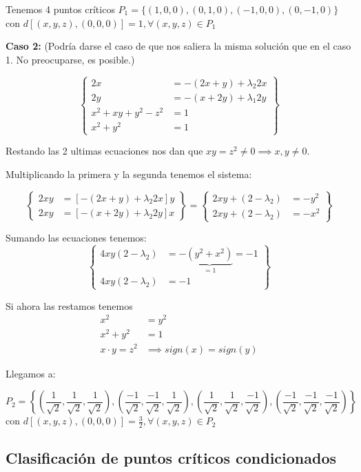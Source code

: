 Tenemos 4 puntos críticos $P_1 = \{(1,0,0),(0,1,0),(-1,0,0),(0,-1,0)\}$ con $d[(x,y,z),(0,0,0)]=1, \forall (x,y,z)\in P_1$

\textbf{Caso 2:} (Podría darse el caso de que nos saliera la misma solución que en el caso 1. No preocuparse, es posible.)


\[\left\{\begin{array}{cc}
2x&= -(2x+y) + \lambda_2 2x\\
2y&= -(x+2y) + \lambda_1 2y\\
x^2+xy+y^2 -z^2 &= 1\\
x^2+y^2&=1
\end{array}\right\}\]

Restando las 2 ultimas ecuaciones nos dan que $xy = z^2 \neq 0 \implies x,y\neq 0$.

Multiplicando la primera y la segunda tenemos el sistema:

\[\left\{\begin{array}{cc}
2xy &= \left[-(2x+y)+\lambda_2 2x\right]y\\
2xy &= \left[-(x+2y)+\lambda_2 2y\right]x
\end{array}\right\} = \left\{\begin{array}{cc}
2xy+(2-\lambda_2) &= -y^2\\
2xy+(2-\lambda_2) & = -x^2\end{array}\right\}
\]

Sumando las ecuaciones tenemos:
\[\left\{\begin{array}{cc}
4xy(2-\lambda_2) &= - \underbrace{(y^2+x^2)}_{=1} = -1\\
4xy(2-\lambda_2)&= -1\end{array}\right\}\]

Si ahora las restamos tenemos \[\begin{array}{cc}x^2&=y^2\\x^2+y^2 &= 1\\ x\cdot y = z^2 &\implies sign(x)=sign(y) \end{array}\]

Llegamos a:

\[P_2 = \left\{
\left(\frac{1}{\sqrt{2}},\frac{1}{\sqrt{2}},\frac{1}{\sqrt{2}}\right),
\left(\frac{-1}{\sqrt{2}},\frac{-1}{\sqrt{2}},\frac{1}{\sqrt{2}}\right),
\left(\frac{1}{\sqrt{2}},\frac{1}{\sqrt{2}},\frac{-1}{\sqrt{2}}\right),
\left(\frac{-1}{\sqrt{2}},\frac{-1}{\sqrt{2}},\frac{-1}{\sqrt{2}}\right)
\right\}\] con $d[(x,y,z),(0,0,0)] = \frac{3}{2}, \forall (x,y,z)\in P_2$

\subsection{Clasificación de puntos críticos condicionados}

